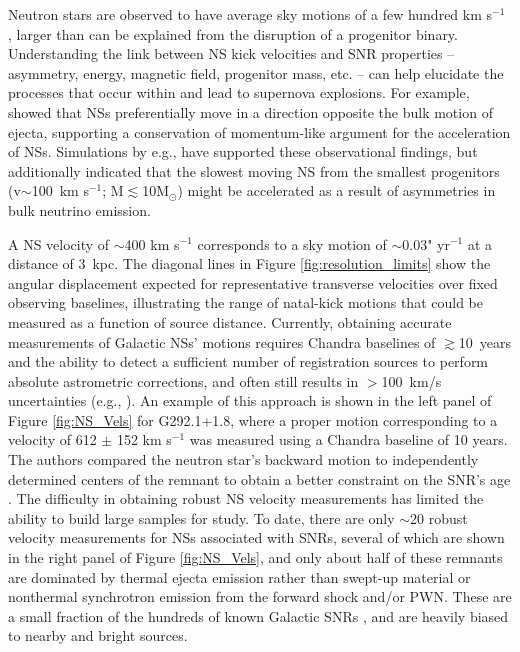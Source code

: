 \documentclass{article}
\begin{document}
Neutron stars are observed to have average sky motions of a few hundred km s$^{-1}$ \cite{2005MNRAS.360..974H,2025ApJ...985...12W,2025A&A...700A..75D}, larger than can be explained from the disruption of a progenitor binary. Understanding the link between NS kick velocities and SNR properties -- asymmetry, energy, magnetic field, progenitor mass, etc. -- can help elucidate the processes that occur within and lead to supernova explosions. For example, \cite{2017ApJ...844...84H,2018ApJ...856...18K} showed that NSs preferentially move in a direction opposite the bulk motion of ejecta, supporting a conservation of momentum-like argument for the acceleration of NSs. Simulations by e.g., \cite{2024ApJ...963...63B} have supported these observational findings, but additionally indicated that the slowest moving NS from the smallest progenitors (v$\sim$100~km s$^{-1}$; M$\lesssim$10M$_\odot$) might be accelerated as a result of asymmetries in bulk neutrino emission. 

A NS velocity of $\sim$400 km s$^{-1}$ corresponds to a sky motion of $\sim$0.03" yr$^{-1}$ at a distance of 3~kpc. The diagonal lines in Figure \ref{fig:resolution_limits} show the angular displacement expected for representative transverse velocities over fixed observing baselines, illustrating the range of natal-kick motions that could be measured as a function of source distance. Currently, obtaining accurate measurements of Galactic NSs' motions requires Chandra baselines of $\gtrsim$10~years and the ability to detect a sufficient number of registration sources to perform absolute astrometric corrections, and often still results in $>$100~km/s uncertainties (e.g., \cite{2021A&A...651A..40M}). An example of this approach is shown in the left panel of Figure \ref{fig:NS_Vels} for G292.1+1.8, where a proper motion corresponding to a velocity of 612 $\pm$ 152 km s$^{-1}$ was measured using a Chandra baseline of 10 years. The authors compared the neutron star's backward motion to independently determined centers of the remnant to obtain a better constraint on the SNR's age \cite{2022ApJ...932..117L}. The difficulty in obtaining robust NS velocity measurements has limited the ability to build large samples for study. To date, there are only $\sim20$ robust velocity measurements for NSs associated with SNRs, several of which are shown in the right panel of Figure \ref{fig:NS_Vels}, and only about half of these remnants are dominated by thermal ejecta emission rather than swept-up material or nonthermal synchrotron emission from the forward shock and/or PWN. These are a small fraction of the hundreds of known Galactic SNRs \cite{2025JApA...46...14G}, and are heavily biased to nearby and bright sources.
\end{document}
